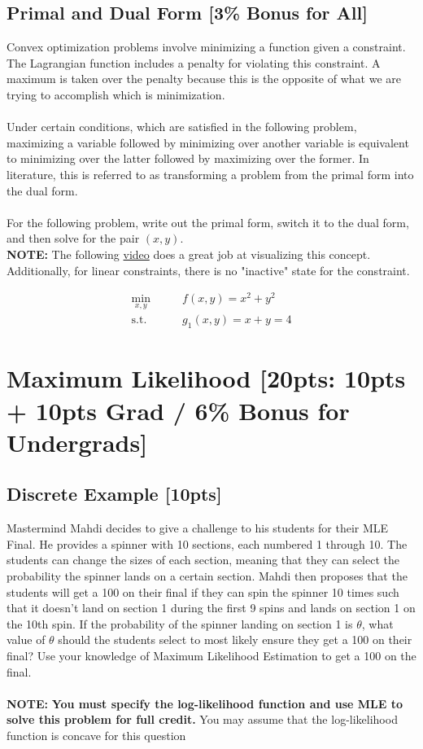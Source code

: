 \documentclass{article}
\begin{document}
\newpage

\subsection{Primal and Dual Form [3\% Bonus for All]}

Convex optimization problems involve minimizing a function given a constraint. The Lagrangian function includes a penalty for violating this constraint. A maximum is taken over the penalty because this is the opposite of what we are trying to accomplish which is minimization. \\\\ 
Under certain conditions, which are satisfied in the following problem, maximizing a variable followed by minimizing over another variable is equivalent to minimizing over the latter followed by maximizing over the former. In literature, this is referred to as transforming a problem from the primal form into the dual form.\\\\
For the following problem, write out the primal form, switch it to the dual form, and then solve for the pair $(x, y)$.\\
\textbf{NOTE:} The following \href{https://youtu.be/uh1Dk68cfWs?si=MHr26ua-Osu-N23m}{video} does a great job at visualizing this concept. Additionally, for linear constraints, there is no "inactive" state for the constraint.

\begin{align*}
    \min_{x,y} \qquad & f(x,y) = x^{2} + y^{2} \\
    \text{s.t.} \qquad & g_{1}(x,y) = x+y = 4
\end{align*}

\newpage
\section{Maximum Likelihood [20pts: 10pts + 10pts Grad / 6\% Bonus for Undergrads]}
\subsection{Discrete Example [10pts]}
Mastermind Mahdi decides to give a challenge to his students for their MLE Final. He provides a spinner with 10 sections, each numbered 1 through 10. The students can change the sizes of each section, meaning that they can select the probability the spinner lands on a certain section. Mahdi then proposes that the students will get a 100 on their final if they can spin the spinner 10 times such that it doesn't land on section 1 during the first 9 spins and lands on section 1 on the 10th spin. If the probability of the spinner landing on section 1 is $\theta$, what value of $\theta$ should the students select to most likely ensure they get a 100 on their final? Use your knowledge of Maximum Likelihood Estimation to get a 100 on the final. \\\\\textbf{NOTE: } \textbf{You must specify the log-likelihood function and use MLE to solve this problem for full credit.} You may assume that the log-likelihood function is concave for this question \\\\
\end{document}
